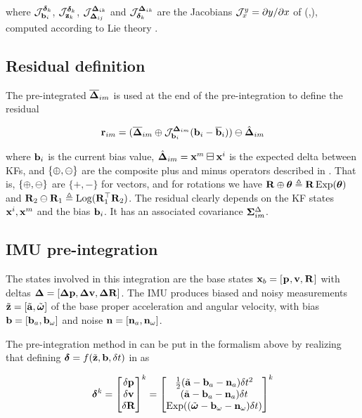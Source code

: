 where ${\mathcal{J}^{\bm\delta_k}_{{\bf b}_i}}$, ${\mathcal{J}^{\bm\delta_k}_{{\bf z}_k}}$, ${\mathcal{J}^{{\bm \Delta}_{ik}}_{{\bm \Delta}_{ij}}}$ and ${\mathcal{J}^{{\bm \Delta}_{ik}}_{\bm\delta_k}}$ 
are the Jacobians ${\mathcal{J}^{y}_{x}}=\partial y/\partial x$ of (,), computed according to Lie theory \cite{sola2018micro}.


\subsection{Residual definition}

The pre-integrated $\overline{{\bm \Delta}}_{im}$ is used at the end of the pre-integration to define the residual

\begin{align}
    {\bf r}_{im} = (\overline{{\bm \Delta}}_{im} \oplus {\mathcal{J}^{{\bm \Delta}_{im}}_{{\bf b}_i}}({\bf b}_i-\overline{{\bf b}}_i) ) \ominus \hat{{\bm \Delta}}_{im}
\end{align}

where ${\bf b}_i$ is the current bias value,  $\hat{{\bm \Delta}}_{im}={\bf x}^m\boxminus{\bf x}^i$ is the expected delta between KFs, and $\{\oplus,\ominus\}$ are the composite
 plus and minus operators described in \cite{sola2018micro}. 
That is, $\{\oplus,\ominus\}$ are $\{+,-\}$ for vectors, and for rotations we have ${\bf R}\oplus\bm\theta\triangleq{\bf R}\operatorname*{Exp}(\bm\theta)$ and ${\bf R}_2\ominus{\bf R}_1\triangleq\operatorname*{Log}({\bf R}_1^{\top}{\bf R}_2)$. 
The residual clearly depends on the KF states ${\bf x}^i,{\bf x}^m$ and the bias ${\bf b}_i$. It has an associated covariance  ${\bm \Sigma}^\Delta_{im}$.



\subsection{IMU pre-integration}

The states involved in this integration are the base states ${\bf x}_b = [\prescript{}{}{{\bf p}}_{}, {\bf v}, \prescript{}{}{{\bf R}}_{}]$ with deltas ${\bm \Delta}=[{\bm \Delta {\bf p}},{\bm \Delta {\bf v}},{\bm \Delta {\bf R}}]$. 
The IMU produces biased and noisy measurements $\tilde{{\bf z}} = [\tilde{{\bf a}}, \tilde{{\bm \omega}}]$ of the base proper acceleration and angular velocity, 
with bias ${\bf b} = [{\bf b}_{a}, {\bf b}_{\omega}]$ and noise ${\bf n} = [{\bf n}_{a}, {\bf n}_{\omega}]$. 

The pre-integration method in  \cite{forster2017-TRO} can be put in the formalism above by realizing that defining $\bm\delta=f(\tilde{{\bf z}},{\bf b},\delta t)$ in  as

\begin{align}
    \bm\delta^k = \begin{bmatrix}
    \delta{\bf p}\\\delta{\bf v}\\\delta{\bf R}
    \end{bmatrix}^k =
    \begin{bmatrix}
    \tfrac12(\tilde{{\bf a}}-{\bf b}_a-{\bf n}_a)\delta t^2 \\
    (\tilde{{\bf a}}-{\bf b}_a-{\bf n}_a)\delta t \\
    \operatorname*{Exp}((\tilde{{\bm \omega}}-{\bf b}_\omega-{\bf n}_\omega)\delta t)
    \end{bmatrix}^k
\end{align}

